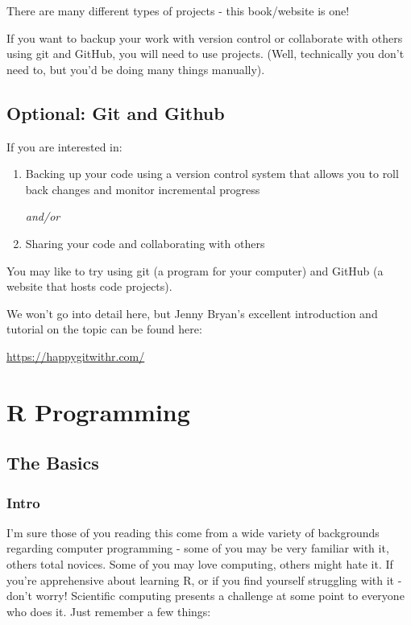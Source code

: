 \documentclass[
  letterpaper,
  DIV=11,
  numbers=noendperiod]{scrreprt}
\begin{document}
There are many different types of projects - this book/website is one!

If you want to backup your work with version control or collaborate with
others using git and GitHub, you will need to use projects. (Well,
technically you don't need to, but you'd be doing many things manually).

\hypertarget{optional-git-and-github}{%
\chapter{Optional: Git and Github}\label{optional-git-and-github}}

If you are interested in:

\begin{enumerate}
\def\labelenumi{\arabic{enumi}.}
\item
  Backing up your code using a version control system that allows you to
  roll back changes and monitor incremental progress

  \emph{and/or}
\item
  Sharing your code and collaborating with others
\end{enumerate}

You may like to try using git (a program for your computer) and GitHub
(a website that hosts code projects).

We won't go into detail here, but Jenny Bryan's excellent introduction
and tutorial on the topic can be found here:

\url{https://happygitwithr.com/}

\part{R Programming}

\hypertarget{the-basics}{%
\chapter{The Basics}\label{the-basics}}

\hypertarget{intro}{%
\section{Intro}\label{intro}}

I'm sure those of you reading this come from a wide variety of
backgrounds regarding computer programming - some of you may be very
familiar with it, others total novices. Some of you may love computing,
others might hate it. If you're apprehensive about learning R, or if you
find yourself struggling with it - don't worry! Scientific computing
presents a challenge at some point to everyone who does it. Just
remember a few things:
\end{document}
